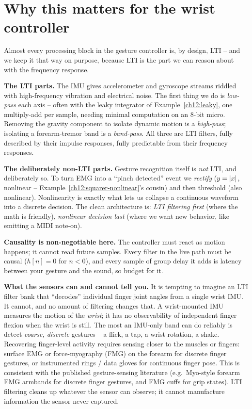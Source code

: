 \section{Why this matters for the wrist controller}
\label{ch12:wrist}

\begin{goalbox}
Almost every processing block in the gesture controller is, by design, LTI -- and
we keep it that way on purpose, because LTI is the part we can reason about with
the frequency response.

\textbf{The LTI parts.} The IMU gives accelerometer and gyroscope streams riddled
with high-frequency vibration and electrical noise. The first thing we do is
\emph{low-pass} each axis -- often with the leaky integrator of
Example~\ref{ch12:leaky}, one multiply-add per sample, needing minimal computation on an
8-bit micro. Removing the gravity component to isolate dynamic motion is a
\emph{high-pass}; isolating a forearm-tremor band is a \emph{band-pass}. All
three are LTI filters, fully described by their impulse responses, fully
predictable from their frequency responses.

\textbf{The deliberately non-LTI parts.} Gesture recognition itself is \emph{not}
LTI, and deliberately so. To turn EMG into a ``pinch detected'' event we
\emph{rectify} ($y=\lvert x\rvert$, nonlinear -- Example~\ref{ch12:squarer-nonlinear}'s
cousin) and then threshold (also nonlinear). Nonlinearity is exactly what lets us
collapse a continuous waveform into a discrete decision. The clean architecture
is: \emph{LTI filtering first} (where the math is friendly), \emph{nonlinear
decision last} (where we want new behavior, like emitting a MIDI
note-on).

\textbf{Causality is non-negotiable here.} The controller must react as motion
happens; it cannot read future samples. Every filter in the live path must be
causal ($h[n]=0$ for $n<0$), and every sample of group delay it adds is latency
between your gesture and the sound, so budget for it.
\end{goalbox}

\begin{trapbox}
\textbf{What the sensors can and cannot tell you.} It is tempting to imagine an LTI filter bank
that ``decodes'' individual finger joint angles from a single wrist IMU. It
cannot, and no amount of filtering changes that. A wrist-mounted IMU measures the
motion of the \emph{wrist}; it has no observability of independent finger flexion
when the wrist is still. The most an IMU-only band can do reliably is detect
\emph{coarse, discrete} gestures -- a flick, a tap, a wrist rotation, a shake.
Recovering finger-level activity requires sensing closer to the muscles or
fingers: surface EMG or force-myography (FMG) on the forearm for discrete
finger gestures, or instrumented rings / data gloves for continuous finger pose.
This is consistent with the published gesture-sensing literature (e.g.\ Myo-style
forearm EMG armbands for discrete finger gestures, and FMG cuffs for grip
states). LTI filtering cleans up whatever the sensor can observe; it cannot
manufacture information the sensor never captured.
\end{trapbox}

